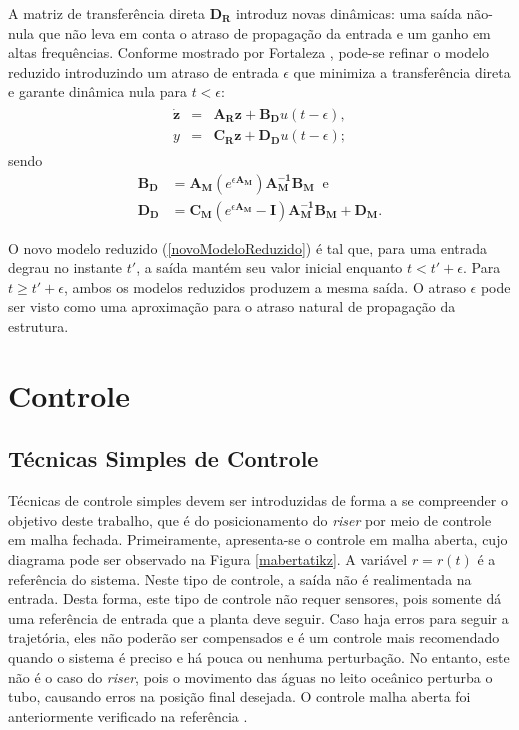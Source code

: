  A matriz de transferência direta $\mathbf{D_R}$ introduz novas dinâmicas: uma saída não-nula que não leva em conta o atraso de propagação da entrada e um ganho em altas frequências. Conforme mostrado por Fortaleza \cite{teseEugenio}, pode-se refinar o modelo reduzido introduzindo um atraso de entrada $\epsilon$ que minimiza a transferência direta e garante dinâmica nula para $t < \epsilon$: \begin{align}
\begin{array}{lll}
	\mathbf{\dot{z}} &=& \mathbf{A_R}\mathbf{z}+\mathbf{B_D}u(t-\epsilon),\\
	y &=& \mathbf{C_R}\mathbf{z}+\mathbf{D_D}u(t-\epsilon) \label{novoModeloReduzido};
\end{array}
\end{align} sendo \begin{align}
	\mathbf{B_D} &= \mathbf{A_M}\left(e^{\epsilon\mathbf{A_M}}\right)\mathbf{A_M^{-1}}\mathbf{B_M}\;\;\mathrm{e}\\
	\mathbf{D_D} &= \mathbf{C_M}\left(e^{\epsilon\mathbf{A_M}} - \mathbf{I}\right)\mathbf{A_M^{-1}}\mathbf{B_M} + \mathbf{D_M}.
\end{align}

 O novo modelo reduzido (\ref{novoModeloReduzido}) é tal que, para uma entrada degrau no instante $t'$, a saída mantém seu valor inicial enquanto $t < t' + \epsilon$. Para $t \ge t' + \epsilon$, ambos os modelos reduzidos produzem a mesma saída. O atraso $\epsilon$ pode ser visto como uma aproximação para o atraso natural de propagação da estrutura.

\section{Controle}
\subsection{Técnicas Simples de Controle}
 Técnicas de controle simples devem ser introduzidas de forma a se compreender o objetivo deste trabalho, que é do posicionamento do \textit{riser} por meio de controle em malha fechada. Primeiramente, apresenta-se o controle em malha aberta, cujo diagrama pode ser observado na Figura \ref{mabertatikz}. A variável $r = r(t)$ é a referência do sistema. Neste tipo de controle, a saída não é realimentada na entrada. Desta forma, este tipo de controle não requer sensores, pois somente dá uma referência de entrada que a planta deve seguir. Caso haja erros para seguir a trajetória, eles não poderão ser compensados e é um controle mais recomendado quando o sistema é preciso e há pouca ou nenhuma perturbação. No entanto, este não é o caso do \textit{riser}, pois o movimento das águas no leito oceânico perturba o tubo, causando erros na posição final desejada. O controle malha aberta foi anteriormente verificado na referência \cite{redytton}.

